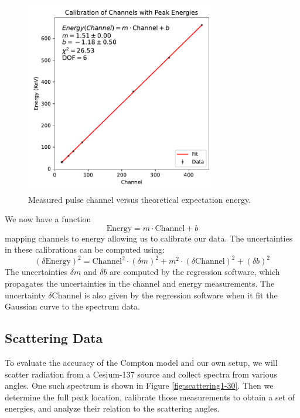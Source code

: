 \documentclass[12pt, letterpaper]{article}
\begin{document}
\begin{figure}[!h]
    \centering
    \includegraphics[width=0.75\textwidth]{experiment2/figures/calibration_3.pdf}
    \caption{Measured pulse channel versus theoretical expectation energy.}
    \label{fig:calibration3}
\end{figure}

We now have a function
\[\text{Energy}=m \cdot \text{Channel} +b\]
mapping channels to energy allowing us to calibrate our data. The uncertainties in these calibrations can be computed using:
\[(\delta \text{Energy})^2 = \text{Channel}^2 \cdot (\delta m)^2 + m^2 \cdot (\delta \text{Channel})^2 + (\delta b)^2\]
The uncertainties $\delta m$ and $\delta b$ are computed by the regression software, which propagates the uncertainties in the channel and energy measurements. The uncertainty $\delta \text{Channel}$ is also given by the regression software when it fit the Gaussian curve to the spectrum data. 

\subsection{Scattering Data}

To evaluate the accuracy of the Compton model and our own setup, we will scatter radiation from a Cesium-137 source and collect spectra from various angles. One such spectrum is shown in Figure \ref{fig:scattering1-30}. Then we determine the full peak location, calibrate those measurements to obtain a set of energies, and analyze their relation to the scattering angles. 
\end{document}

